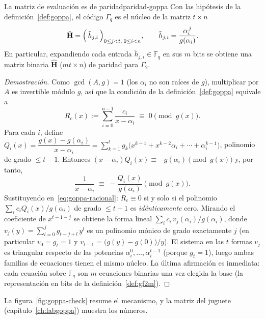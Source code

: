 \documentclass[11pt,a4paper,oneside]{report}
\newcommand{\GF}[1]{\mathbb{F}_{#1}}
\newcommand{\Hmat}{\mathbf{H}}          %
\begin{document}
\begin{proposicion}{La matriz de evaluación es de paridad}{paridad-goppa}
Con las hipótesis de la definición~\ref{def:goppa}, el código $\Gamma_q$
es el núcleo de la matriz $t\times n$
\[
\tilde{\Hmat}=\Bigl(\,\tilde h_{j,i}\,\Bigr)_{0\le j<t,\;0\le i<n},
\qquad
\tilde h_{j,i}=\frac{\alpha_i^{\,j}}{g(\alpha_i)} .
\]
En particular, expandiendo cada entrada $\tilde h_{j,i}\in\GF{q}$ en sus
$m$ bits se obtiene una matriz binaria $\hat{\Hmat}$ ($mt\times n$) de
paridad para $\Gamma_2$.
\end{proposicion}
\begin{proof}[Demostración]
Como $\gcd(A,g)=1$ (los $\alpha_i$ no son raíces de $g$), multiplicar por
$A$ es invertible módulo $g$, así que la condición de la
definición~\ref{def:goppa} equivale a
\begin{equation}
R_c(x):=\sum_{i=0}^{n-1}\frac{c_i}{x-\alpha_i}\;\equiv\;0\pmod{g(x)}.
\label{eq:goppa-racional}
\end{equation}
Para cada $i$, define $Q_i(x)=\dfrac{g(x)-g(\alpha_i)}{x-\alpha_i}
=\sum_{k=1}^{t} g_k\bigl(x^{k-1}+x^{k-2}\alpha_i+\cdots+\alpha_i^{k-1}\bigr)$,
polinomio de grado $\le t-1$. Entonces
$(x-\alpha_i)Q_i(x)\equiv-g(\alpha_i)\pmod{g(x)}$ y, por tanto,
\[
\frac{1}{x-\alpha_i}\;\equiv\;-\frac{Q_i(x)}{g(\alpha_i)}
\pmod{g(x)} .
\]
Sustituyendo en~\eqref{eq:goppa-racional}: $R_c\equiv0$ si y solo si el
polinomio $\sum_i c_i Q_i(x)/g(\alpha_i)$ de grado $\le t-1$ es
\emph{idénticamente} cero. Mirando el coeficiente de $x^{t-1-j}$ se obtiene
la forma lineal $\sum_i c_i\,v_j(\alpha_i)/g(\alpha_i)$, donde
$v_j(y)=\sum_{l=0}^{j}g_{t-j+l}\,y^{l}$ es un polinomio mónico de grado
exactamente $j$ (en particular $v_0=g_t=1$ y
$v_{t-1}=\bigl(g(y)-g(0)\bigr)/y$). El sistema en las $t$ formas $v_j$ es triangular respecto de las
potencias $\alpha_i^{0},\dots,\alpha_i^{t-1}$ (porque $g_t=1$), luego ambas
familias de ecuaciones tienen el mismo núcleo. La última afirmación es
inmediata: cada ecuación sobre $\GF{q}$ son $m$ ecuaciones binarias una vez
elegida la base (la representación en bits de la definición~\ref{def:gf2m}).
\end{proof}

\noindent La figura~\ref{fig:goppa-check} resume el mecanismo, y la
matriz del juguete (capítulo~\ref{ch:labgoppa}) muestra los números.
\end{document}
